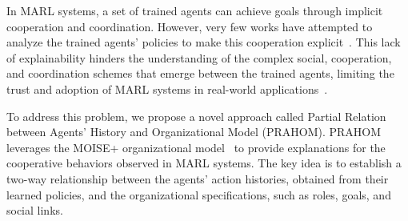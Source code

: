 \documentclass{ecai}
\newcounter{relation}
\begin{document}
In MARL systems, a set of trained agents can achieve goals through implicit cooperation and coordination. However, very few works have attempted to analyze the trained agents' policies to make this cooperation explicit~\citep{albrecht2018survey,perolat2017pool}. This lack of explainability hinders the understanding of the complex social, cooperation, and coordination schemes that emerge between the trained agents, limiting the trust and adoption of MARL systems in real-world applications~\citep{kok2006collaborative,omidshafiei2019learning}.

To address this problem, we propose a novel approach called Partial Relation between Agents' History and Organizational Model (PRAHOM). PRAHOM leverages the MOISE+ organizational model~\citep{hubner2007moise} to provide explanations for the cooperative behaviors observed in MARL systems. The key idea is to establish a two-way relationship between the agents' action histories, obtained from their learned policies, and the organizational specifications, such as roles, goals, and social links.
\end{document}

